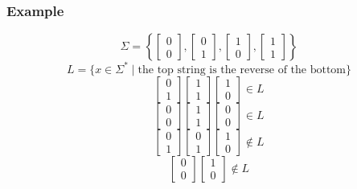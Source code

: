 \documentclass{math}
\begin{document}
\subsubsection*{Example}
\[ \Sigma = \left\{
  \begin{bmatrix}0 \\ 0\end{bmatrix},
  \begin{bmatrix}0 \\ 1\end{bmatrix},
  \begin{bmatrix}1 \\ 0\end{bmatrix},
  \begin{bmatrix}1 \\ 1\end{bmatrix}
\right\} \]
\[ L = \{x\in\Sigma^*\mid\text{the top string is the reverse of the bottom}\} \]
\[ \begin{bmatrix}0 \\ 1\end{bmatrix}
  \begin{bmatrix}1 \\ 1\end{bmatrix}
  \begin{bmatrix}1 \\ 0\end{bmatrix}\in L \]
\[ \begin{bmatrix}0 \\ 0\end{bmatrix}
  \begin{bmatrix}1 \\ 1\end{bmatrix}
  \begin{bmatrix}0 \\ 0\end{bmatrix}\in L \]
\[ \begin{bmatrix}0 \\ 1\end{bmatrix}
  \begin{bmatrix}0 \\ 1\end{bmatrix}
  \begin{bmatrix}1 \\ 0\end{bmatrix}\notin L \]
\[ \begin{bmatrix}0 \\ 0\end{bmatrix}
  \begin{bmatrix}1 \\ 0\end{bmatrix}\notin L \]
\end{document}
